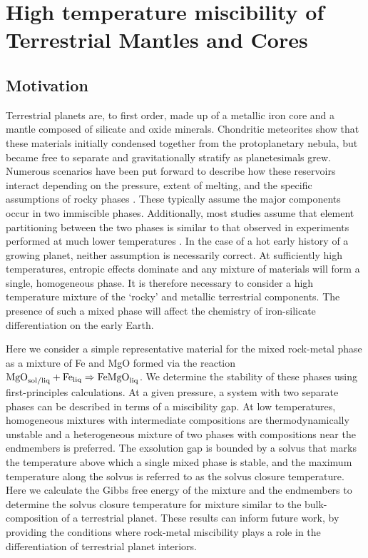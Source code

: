 \chapter{High temperature miscibility of Terrestrial Mantles and Cores}\label{chap6}

\section{Motivation}

Terrestrial planets are, to first order, made up of a metallic iron core and a mantle
composed of silicate and oxide minerals. Chondritic meteorites show that these materials
initially condensed together from the protoplanetary nebula, but became free to separate
and gravitationally stratify as planetesimals grew.  Numerous scenarios have been put
forward to describe how these reservoirs interact depending on the pressure, extent of
melting, and the specific assumptions of rocky phases
\citep{Stevenson1990,Solomatov2007,Rubie2007}. These typically assume the major components
occur in two immiscible phases. Additionally, most studies assume that element
partitioning between the two phases is similar to that observed in experiments performed
at much lower temperatures \citep{McDonough1995}. In the case of a hot early history of a
growing planet, neither assumption is necessarily correct. At sufficiently high
temperatures, entropic effects dominate and any mixture of materials will form a single,
homogeneous phase. It is therefore necessary to consider a high temperature mixture of
the `rocky' and metallic terrestrial components. The presence of such a mixed phase will
affect the chemistry of iron-silicate differentiation on the early Earth.

Here we consider a simple representative material for the mixed rock-metal phase as a mixture
of Fe and MgO formed via the reaction
$\rm{MgO}_{\rm sol/liq} + \rm{Fe}_{\rm liq} \Rightarrow \rm{FeMgO}_{\rm liq}$. 
We determine the stability of these phases using first-principles calculations.  At a
given pressure, a system with two separate phases can be described in terms of a
miscibility gap. At low temperatures, homogeneous mixtures with intermediate compositions
are thermodynamically unstable and a heterogeneous mixture of two phases with
compositions near the endmembers is preferred. The exsolution gap is bounded by a solvus
that marks the temperature above which a single mixed phase is stable, and the maximum
temperature along the solvus is referred to as the solvus closure temperature. Here we calculate
the Gibbs free energy of the mixture and the endmembers to determine the solvus closure
temperature for mixture similar to the bulk-composition of a terrestrial planet. These
results can inform future work, by providing the conditions where rock-metal miscibility
plays a role in the differentiation of terrestrial planet interiors.


